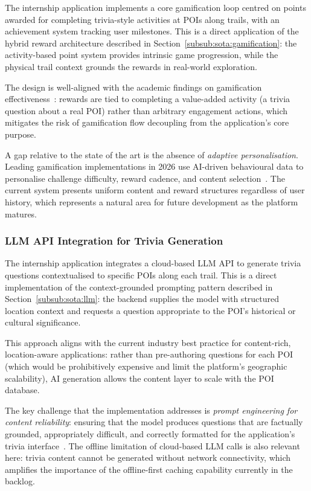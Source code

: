 The internship application implements a core gamification loop
centred on points awarded for completing trivia-style activities at
POIs along trails, with an achievement system tracking user
milestones.
This is a direct application of the hybrid reward architecture
described in Section~\ref{subsub:sota:gamification}: the
activity-based point system provides intrinsic game progression,
while the physical trail context grounds the rewards in real-world
exploration.
 
The design is well-aligned with the academic findings on
gamification effectiveness~\cite{ama2025gamification}: rewards
are tied to completing a value-added activity (a trivia question
about a real POI) rather than arbitrary engagement actions,
which mitigates the risk of gamification flow decoupling from the
application's core purpose.
 
A gap relative to the state of the art is the absence of
\textit{adaptive personalisation}.
Leading gamification implementations in 2026 use AI-driven
behavioural data to personalise challenge difficulty, reward
cadence, and content selection~\cite{amplifai2026gamification}.
The current system presents uniform content and reward structures
regardless of user history, which represents a natural area for
future development as the platform matures.
 
 
\subsubsection{LLM API Integration for Trivia
Generation}\label{subsub:contrast:llm}
 
The internship application integrates a cloud-based LLM API to
generate trivia questions contextualised to specific POIs along
each trail.
This is a direct implementation of the context-grounded prompting
pattern described in Section~\ref{subsub:sota:llm}: the backend
supplies the model with structured location context and requests
a question appropriate to the POI's historical or cultural
significance.
 
This approach aligns with the current industry best practice for
content-rich, location-aware applications: rather than
pre-authoring questions for each POI (which would be
prohibitively expensive and limit the platform's geographic
scalability), AI generation allows the content layer to scale
with the POI database.
 
The key challenge that the implementation addresses is
\textit{prompt engineering for content reliability}: ensuring that
the model produces questions that are factually grounded,
appropriately difficult, and correctly formatted for the
application's trivia interface~\cite{gravitee2026llmapi}.
The offline limitation of cloud-based LLM calls is also relevant
here: trivia content cannot be generated without network
connectivity, which amplifies the importance of the offline-first
caching capability currently in the backlog.

